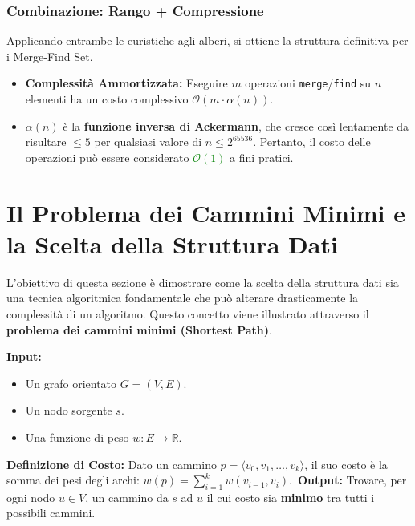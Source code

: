 \documentclass[12pt, a4paper]{article}
\begin{document}
\subsubsection{Combinazione: Rango + Compressione}
Applicando entrambe le euristiche agli alberi, si ottiene la struttura definitiva per i Merge-Find Set.
\begin{itemize}
\item \textbf{Complessità Ammortizzata:} Eseguire $m$ operazioni \texttt{merge}/\texttt{find} su $n$ elementi ha un costo complessivo $\mathcal{O}(m \cdot \alpha(n))$.
\item $\alpha(n)$ è la \textbf{funzione inversa di Ackermann}, che cresce così lentamente da risultare $\le 5$ per qualsiasi valore di $n \le 2^{65536}$. Pertanto, il costo delle operazioni può essere considerato \textcolor{green}{$\mathcal{O}(1)$} a fini pratici.
\end{itemize}


\section{Il Problema dei Cammini Minimi e la Scelta della Struttura Dati}

L'obiettivo di questa sezione è dimostrare come la scelta della struttura dati sia una tecnica algoritmica fondamentale che può alterare drasticamente la complessità di un algoritmo. Questo concetto viene illustrato attraverso il \textbf{problema dei cammini minimi (Shortest Path)}.

\begin{tcolorbox}[colback=lightergray!10, colframe=tocsec, title=\textbf{Definizione: Cammini Minimi da Singola Sorgente (SSSP)}]
\textbf{Input:}
\begin{itemize}
\item Un grafo orientato $G = (V,E)$.
\item Un nodo sorgente $s$.
\item Una funzione di peso $w: E \rightarrow \mathbb{R}$.
\end{itemize}
\textbf{Definizione di Costo:} Dato un cammino $p = \langle v_0, v_1, \dots, v_k \rangle$, il suo costo è la somma dei pesi degli archi: $w(p) = \sum_{i=1}^k w(v_{i-1}, v_i)$.\
\textbf{Output:} Trovare, per ogni nodo $u \in V$, un cammino da $s$ ad $u$ il cui costo sia \textbf{minimo} tra tutti i possibili cammini.
\end{tcolorbox}
\end{document}
